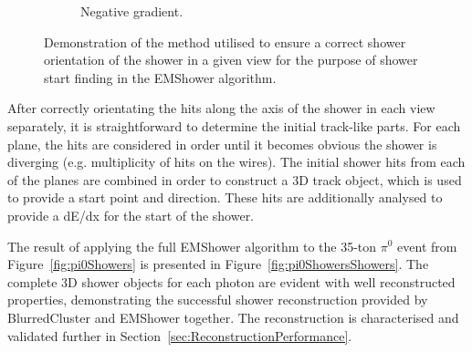 \begin{figure}
\begin{subfigure}[t]{0.48\linewidth}
    \caption{Negative gradient.}
    \label{fig:EMShowerOrientationNegative}
  \end{subfigure}
  \caption[Demonstration of the method utilised to ensure a correct shower orientation of the shower in a given view for the purpose of shower start finding in the EMShower algorithm.]{Demonstration of the method utilised to ensure a correct shower orientation of the shower in a given view for the purpose of shower start finding in the EMShower algorithm.}
  \label{fig:EMShowerOrientation}
\end{figure}

After correctly orientating the hits along the axis of the shower in each view separately, it is straightforward to determine the initial track-like parts.  For each plane, the hits are considered in order until it becomes obvious the shower is diverging (e.g. multiplicity of hits on the wires).  The initial shower hits from each of the planes are combined in order to construct a 3D track object, which is used to provide a start point and direction.  These hits are additionally analysed to provide a dE/dx for the start of the shower.

The result of applying the full EMShower algorithm to the 35-ton $\pi^0$ event from Figure~\ref{fig:pi0Showers} is presented in Figure~\ref{fig:pi0ShowersShowers}.  The complete 3D shower objects for each photon are evident with well reconstructed properties, demonstrating the successful shower reconstruction provided by BlurredCluster and EMShower together.  The reconstruction is characterised and validated further in Section~\ref{sec:ReconstructionPerformance}.


